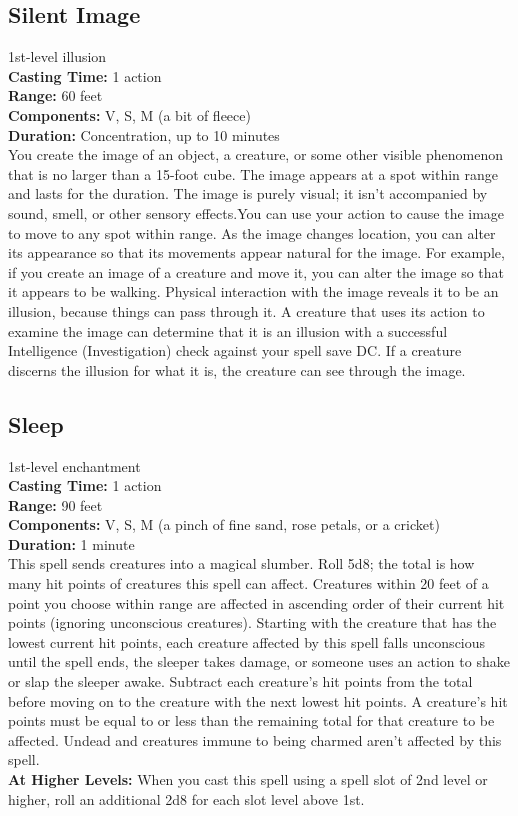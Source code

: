 \documentclass[11pt, A4paper, english]{article}
\begin{document}
		\subsection{Silent Image}
1st-level illusion \\
\textbf{Casting Time:} 1 action \\
\textbf{Range:} 60 feet \\
\textbf{Components:} V, S, M (a bit of fleece) \\
\textbf{Duration:} Concentration, up to  10 minutes \\
You create the image of an object, a creature, or some other visible phenomenon that is no larger than a 15-foot cube. The image appears at a spot within range and lasts for the duration. The image is purely visual; it isn't accompanied by sound, smell, or other sensory effects.You can use your action to cause the image to move to any spot within range. As the image changes location, you can alter its appearance so that its movements appear natural for the image. For example, if you create an image of a creature and move it, you can alter the image so that it appears to be walking. Physical interaction with the image reveals it to be an illusion, because things can pass through it. A creature that uses its action to examine the image can determine that it is an illusion with a successful Intelligence (Investigation) check against your spell save DC. If a creature discerns the illusion for what it is, the creature can see through the image.

		\subsection{Sleep}
1st-level enchantment \\
\textbf{Casting Time:} 1 action \\
\textbf{Range:} 90 feet \\
\textbf{Components:} V, S, M (a pinch of fine sand, rose petals, or a cricket) \\
\textbf{Duration:} 1 minute \\
This spell sends creatures into a magical slumber. Roll 5d8; the total is how many hit points of creatures this spell can affect. Creatures within 20 feet of a point you choose within range are affected in ascending order of their current hit points (ignoring unconscious creatures). Starting with the creature that has the lowest current hit points, each creature affected by this spell falls unconscious until the spell ends, the sleeper takes damage, or someone uses an action to shake or slap the sleeper awake. Subtract each creature’s hit points from the total before moving on to the creature with the next lowest hit points. A creature’s hit points must be equal to or less than the remaining total for that creature to be affected. Undead and creatures immune to being charmed aren’t affected by this spell. \\
\textbf{At Higher Levels:} When you cast this spell using a spell slot of 2nd level or higher, roll an additional 2d8 for each slot level above 1st.
\end{document}
